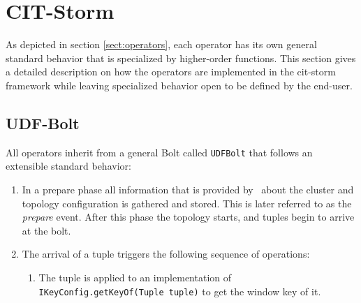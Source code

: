 \section{CIT-Storm}
\label{sect:citStorm}

As depicted in section \ref{sect:operators}, each operator has its own general standard behavior that is specialized by higher-order functions. This section gives a detailed description on how the operators are implemented in the cit-storm framework while leaving specialized behavior open to be defined by the end-user. 

\subsection{UDF-Bolt}
\label{sect:udfBolt}

All operators inherit from a general Bolt called \texttt{UDFBolt} that follows an extensible standard behavior:

\begin{enumerate}
	\item In a prepare phase all information that is provided by \storm\ about the cluster and topology configuration is gathered and stored. This is later referred to as the \textsl{prepare} event. After this phase the topology starts, and tuples begin to arrive at the bolt.
	\item The arrival of a tuple triggers the following sequence of operations:
		\begin{enumerate}
			\item The tuple is applied to an implementation of \texttt{IKeyConfig.getKeyOf(Tuple tuple)} to get the window key of it. 
		\end{enumerate}
\end{enumerate}

